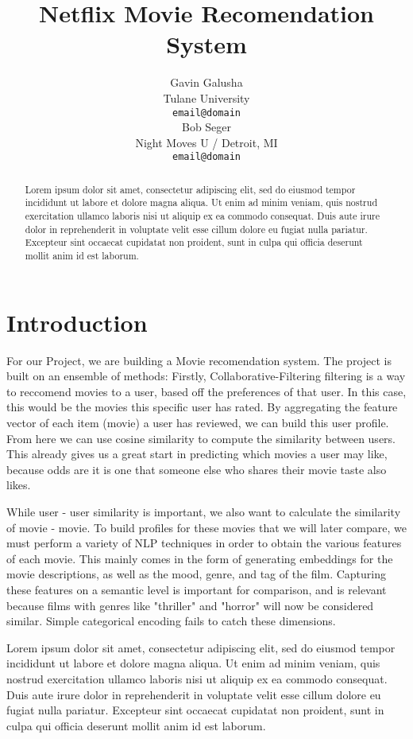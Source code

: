 \documentclass[11pt,a4paper]{article}
\title{Netflix Movie Recomendation System}
\author{Gavin Galusha \\
  Tulane University \\
  \texttt{email@domain} \\\And
  Bob Seger \\
  Night Moves U / Detroit, MI \\
  \texttt{email@domain} \\}
\date{}
\begin{document}
\maketitle
\begin{abstract}
Lorem ipsum dolor sit amet, consectetur adipiscing elit, sed do eiusmod tempor incididunt ut labore et dolore magna aliqua. Ut enim ad minim veniam, quis nostrud exercitation ullamco laboris nisi ut aliquip ex ea commodo consequat. Duis aute irure dolor in reprehenderit in voluptate velit esse cillum dolore eu fugiat nulla pariatur. Excepteur sint occaecat cupidatat non proident, sunt in culpa qui officia deserunt mollit anim id est laborum.
\end{abstract}


\section{Introduction}

For our Project, we are building a Movie recomendation system. The project is built on an ensemble of methods: Firstly, Collaborative-Filtering filtering is a way to reccomend movies to a user, based off the preferences of that user. In this case, this would be the movies this specific user has rated.
By aggregating the feature vector of each item (movie) a user has reviewed, we can build this user profile. From here we can use cosine similarity to compute the similarity between users. This already gives us a great start in predicting which movies a user may like, because odds are it is one that someone else
who shares their movie taste also likes.

While user - user similarity is important, we also want to calculate the similarity of movie - movie. To build profiles for these movies that we will later compare, we must perform a variety of NLP techniques in order to obtain the various features of each movie. This mainly
comes in the form of generating embeddings for the movie descriptions, as well as the mood, genre, and tag of the film. Capturing these features on a semantic level is important for comparison, and is relevant because films with genres like "thriller" and "horror" will now be considered similar. Simple categorical encoding fails to catch these dimensions.




Lorem ipsum dolor sit amet, consectetur adipiscing elit, sed do eiusmod tempor incididunt ut labore et dolore magna aliqua. Ut enim ad minim veniam, quis nostrud exercitation ullamco laboris nisi ut aliquip ex ea commodo consequat. Duis aute irure dolor in reprehenderit in voluptate velit esse cillum dolore eu fugiat nulla pariatur. Excepteur sint occaecat cupidatat non proident, sunt in culpa qui officia deserunt mollit anim id est laborum.
\end{document}
